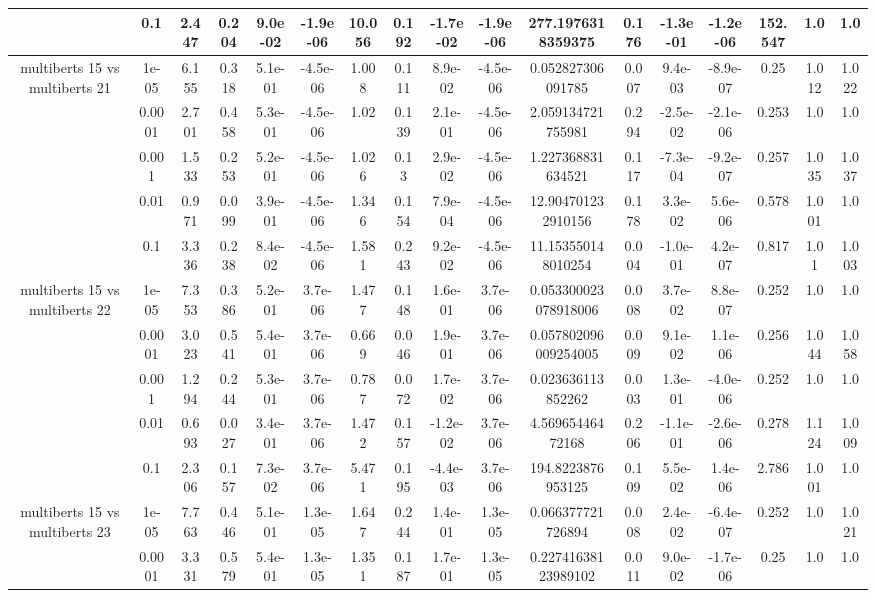 \begin{tabular}{|c|c|c|c|c|c|c|c|c|c|c|c|c|c|c|c|c|}
 & 0.1 & 2.447 & 0.204 & 9.0e-02 & -1.9e-06 & 10.056 & 0.192 & -1.7e-02 & -1.9e-06 & 277.1976318359375 & 0.176 & -1.3e-01 & -1.2e-06 & 152.547 & 1.0 & 1.0 \\
\hline
\multirow{5}{*}{multiberts 15 vs multiberts 21} & 1e-05 & 6.155 & 0.318 & 5.1e-01 & -4.5e-06 & 1.008 & 0.111 & 8.9e-02 & -4.5e-06 & 0.052827306091785 & 0.007 & 9.4e-03 & -8.9e-07 & 0.25 & 1.012 & 1.022 \\
 & 0.0001 & 2.701 & 0.458 & 5.3e-01 & -4.5e-06 & 1.02 & 0.139 & 2.1e-01 & -4.5e-06 & 2.059134721755981 & 0.294 & -2.5e-02 & -2.1e-06 & 0.253 & 1.0 & 1.0 \\
 & 0.001 & 1.533 & 0.253 & 5.2e-01 & -4.5e-06 & 1.026 & 0.13 & 2.9e-02 & -4.5e-06 & 1.227368831634521 & 0.117 & -7.3e-04 & -9.2e-07 & 0.257 & 1.035 & 1.037 \\
 & 0.01 & 0.971 & 0.099 & 3.9e-01 & -4.5e-06 & 1.346 & 0.154 & 7.9e-04 & -4.5e-06 & 12.904701232910156 & 0.178 & 3.3e-02 & 5.6e-06 & 0.578 & 1.001 & 1.0 \\
 & 0.1 & 3.336 & 0.238 & 8.4e-02 & -4.5e-06 & 1.581 & 0.243 & 9.2e-02 & -4.5e-06 & 11.153550148010254 & 0.004 & -1.0e-01 & 4.2e-07 & 0.817 & 1.01 & 1.003 \\
\hline
\multirow{5}{*}{multiberts 15 vs multiberts 22} & 1e-05 & 7.353 & 0.386 & 5.2e-01 & 3.7e-06 & 1.477 & 0.148 & 1.6e-01 & 3.7e-06 & 0.053300023078918006 & 0.008 & 3.7e-02 & 8.8e-07 & 0.252 & 1.0 & 1.0 \\
 & 0.0001 & 3.023 & 0.541 & 5.4e-01 & 3.7e-06 & 0.669 & 0.046 & 1.9e-01 & 3.7e-06 & 0.057802096009254005 & 0.009 & 9.1e-02 & 1.1e-06 & 0.256 & 1.044 & 1.058 \\
 & 0.001 & 1.294 & 0.244 & 5.3e-01 & 3.7e-06 & 0.787 & 0.072 & 1.7e-02 & 3.7e-06 & 0.023636113852262 & 0.003 & 1.3e-01 & -4.0e-06 & 0.252 & 1.0 & 1.0 \\
 & 0.01 & 0.693 & 0.027 & 3.4e-01 & 3.7e-06 & 1.472 & 0.157 & -1.2e-02 & 3.7e-06 & 4.56965446472168 & 0.206 & -1.1e-01 & -2.6e-06 & 0.278 & 1.124 & 1.009 \\
 & 0.1 & 2.306 & 0.157 & 7.3e-02 & 3.7e-06 & 5.471 & 0.195 & -4.4e-03 & 3.7e-06 & 194.8223876953125 & 0.109 & 5.5e-02 & 1.4e-06 & 2.786 & 1.001 & 1.0 \\
\hline
\multirow{5}{*}{multiberts 15 vs multiberts 23} & 1e-05 & 7.763 & 0.446 & 5.1e-01 & 1.3e-05 & 1.647 & 0.244 & 1.4e-01 & 1.3e-05 & 0.066377721726894 & 0.008 & 2.4e-02 & -6.4e-07 & 0.252 & 1.0 & 1.021 \\
 & 0.0001 & 3.331 & 0.579 & 5.4e-01 & 1.3e-05 & 1.351 & 0.187 & 1.7e-01 & 1.3e-05 & 0.22741638123989102 & 0.011 & 9.0e-02 & -1.7e-06 & 0.25 & 1.0 & 1.0 \\

\end{tabular}
